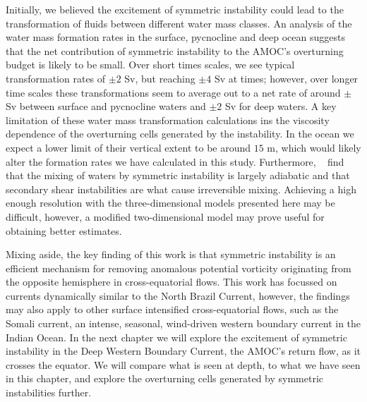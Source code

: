 Initially, we believed the excitement of symmetric instability could lead to the transformation of fluids between different water mass classes. An analysis of the water mass formation rates in the surface, pycnocline and deep ocean suggests that the net contribution of symmetric instability to the AMOC's overturning budget is likely to be small. Over short times scales, we see typical transformation rates of $\pm 2$ Sv, but reaching $\pm 4$ Sv at times; however, over longer time scales these transformations seem to average out to a net rate of around $\pm $ Sv between surface and pycnocline waters and $\pm 2$ Sv for deep waters. A key limitation of these water mass transformation calculations ins the viscosity dependence of the overturning cells generated by the instability. In the ocean we expect a lower limit of their vertical extent to be around $15$ m, which would likely alter the formation rates we have calculated in this study. Furthermore, ~\citet{Yankovsky2019} find that the mixing of waters by symmetric instability is largely adiabatic and that secondary shear instabilities are what cause irreversible mixing. Achieving a high enough resolution with the three-dimensional models presented here may be difficult, however, a modified two-dimensional model may prove useful for obtaining better estimates.

Mixing aside, the key finding of this work is that symmetric instability is an efficient mechanism for removing anomalous potential vorticity originating from the opposite hemisphere in cross-equatorial flows. This work has focussed on currents dynamically similar to the North Brazil Current, however, the findings may also apply to other surface intensified cross-equatorial flows, such as the Somali current, an intense, seasonal, wind-driven western boundary current in the Indian Ocean. In the next chapter we will explore the excitement of symmetric instability in the Deep Western Boundary Current, the AMOC's return flow, as it crosses the equator. We will compare what is seen at depth, to what we have seen in this chapter, and explore the overturning cells generated by symmetric instabilities further.